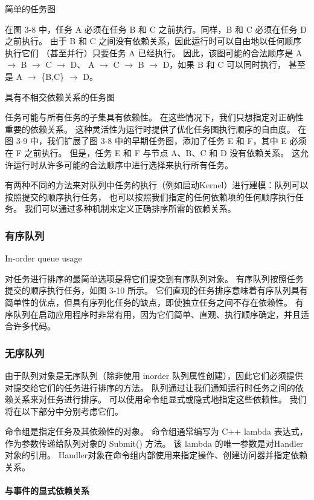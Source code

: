 {\color{red} 简单的任务图 }

在图 3-8 中，任务 A 必须在任务 B 和 C 之前执行。同样，B 和 C 必须在任务 D 之前执行。
由于 B 和 C 之间没有依赖关系，因此运行时可以自由地以任何顺序执行它们 （甚至并行）只要任务 A 已经执行。 
因此，该图可能的合法顺序是 A $\rightarrow$ B $\rightarrow$ C $\rightarrow$ D、
A $\rightarrow$ C $\rightarrow$ B $\rightarrow$ D，如果 B 和 C 可以同时执行，
甚至是 A $\rightarrow$ \{B,C\} $\rightarrow$ D。

{\color{red} 具有不相交依赖关系的任务图}

任务可能与所有任务的子集具有依赖性。 在这些情况下，我们只想指定对正确性重要的依赖关系。 
这种灵活性为运行时提供了优化任务图执行顺序的自由度。 
在图 3-9 中，我们扩展了图 3-8 中的早期任务图，添加了任务 E 和 F，其中 E 必须在 F 之前执行。
但是，任务 E 和 F 与节点 A、B、C 和 D 没有依赖关系。 这允许运行时从许多可能的合法顺序中进行选择来执行所有任务。

有两种不同的方法来对队列中任务的执行（例如启动Kernel）进行建模：队列可以按照提交的顺序执行任务，
也可以按照我们指定的任何依赖项的任何顺序执行任务。 我们可以通过多种机制来定义正确排序所需的依赖关系。

\subsubsection{有序队列}
{\color{red} In-order queue usage}

对任务进行排序的最简单选项是将它们提交到有序队列对象。 有序队列按照任务提交的顺序执行任务，如图 3-10 所示。 
它们直观的任务排序意味着有序队列具有简单性的优点，但具有序列化任务的缺点，即使独立任务之间不存在依赖性。 
有序队列在启动应用程序时非常有用，因为它们简单、直观、执行顺序确定，并且适合许多代码。

\subsubsection{无序队列}
由于队列对象是无序队列（除非使用 inorder 队列属性创建），因此它们必须提供对提交给它们的任务进行排序的方法。 
队列通过让我们通知运行时任务之间的依赖关系来对任务进行排序。 可以使用命令组显式或隐式地指定这些依赖性。 
我们将在以下部分中分别考虑它们。

命令组是指定任务及其依赖性的对象。 命令组通常编写为 C++ lambda 表达式，作为参数传递给队列对象的 Submit() 方法。 
该 lambda 的唯一参数是对Handler对象的引用。 Handler对象在命令组内部使用来指定操作、创建访问器并指定依赖关系。

\paragraph{与事件的显式依赖关系}

